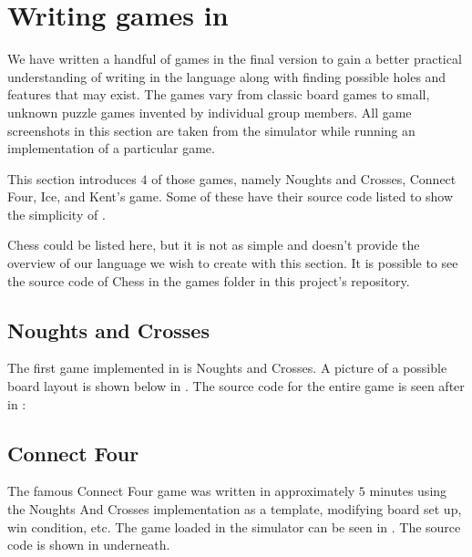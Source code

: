 \section{Writing games in \productname{}}
We have written a handful of games in the final version \productname{}
to gain a better practical understanding of writing in the language
along with finding possible holes and features that may exist. The games
vary from classic board games to small, unknown puzzle games invented by
individual group members. All game screenshots in this section are taken
from the simulator while running an implementation of a particular game.

This section introduces $4$ of those games, namely Noughts and Crosses,
Connect Four, Ice, and Kent's game. Some of these have their source code
listed to show the simplicity of \productname{}.

Chess could be listed here, but it is not as simple and doesn't provide
the overview of our language we wish to create with this section. It is
possible to see the source code of Chess in the games folder in this
project's repository.

\subsection{Noughts and Crosses}
The first game implemented in \productname{} is Noughts and
Crosses. A picture of a possible board layout is shown below in
. The source code for the entire game is seen
after in :




\subsection{Connect Four}
The famous Connect Four game was written in approximately $5$ minutes
using the Noughts And Crosses implementation as a template, modifying
board set up, win condition, etc. The game loaded in the simulator can
be seen in . The source code is shown in
 underneath.



